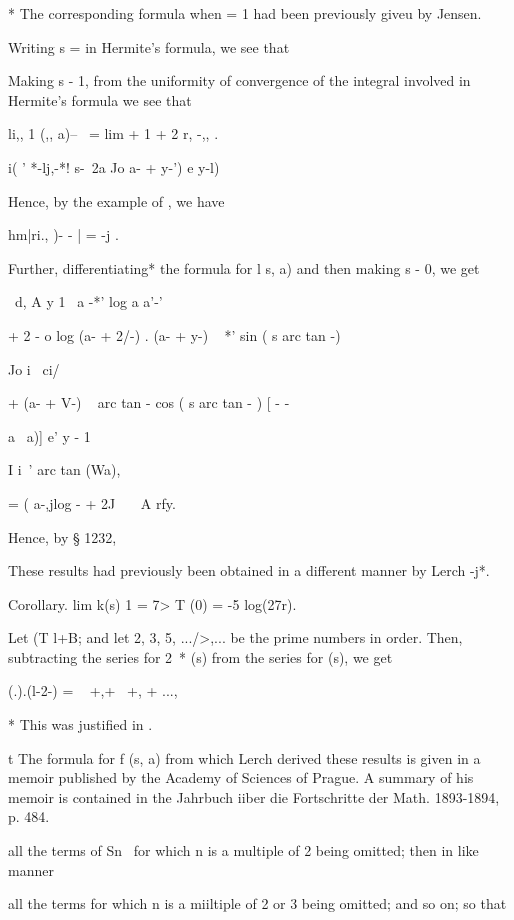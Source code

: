 * The corresponding formula when = 1 had been previously giveu by
Jensen.

%
%

Writing s = in Hermite's
formula, we see that

Making s - 1, from the uniformity of convergence of the integral
involved in Hermite's formula we see that

li,, 1 (,, a)-- \ = lim + 1 + 2 r, -,, .

  i( ' *-lj,-*! s-\ 2a Jo a- + y-') e y-l)

Hence, by the example of , we have

hm|ri., )- - | = -j .

Further, differentiating* the formula for l s, a) and then making s -
0, we get

\ d, A y 1 \, a -*' log a a'-'

+ 2 - o log (a- + 2/-) . (a- + y-) ~ *' sin ( s arc tan -)

Jo i \ ci/

+ (a- + V-) ~ arc tan - cos ( s arc tan - ) [ - -

    a \ a)] e' y - 1

I i\, ' arc tan (Wa),

= ( a-,jlog - + 2J \ \ \ A rfy.

Hence, by § 1232,

These results had previously been obtained in a different manner by
Lerch -j*.

Corollary. lim k(s) 1 = 7> T (0) = -5 log(27r).


Let (T l+B; and let 2, 3, 5, .../>,... be the prime numbers in order.
Then, subtracting the series for 2~* (s) from the series for (s), we
get

 (.).(l-2-) = ~ +,+~ +, + ...,

* This was justified in .

t The formula for f (s, a) from which Lerch derived these results is
given in a memoir published by the Academy of Sciences of Prague. A
summary of his memoir is contained in the Jahrbuch iiber die
Fortschritte der Math. 1893-1894, p. 484.

%
%

all the terms of Sn~ for which n is a multiple of 2 being omitted;
then in like manner

all the terms for which n is a miiltiple of 2 or 3 being omitted; and
so on; so that

